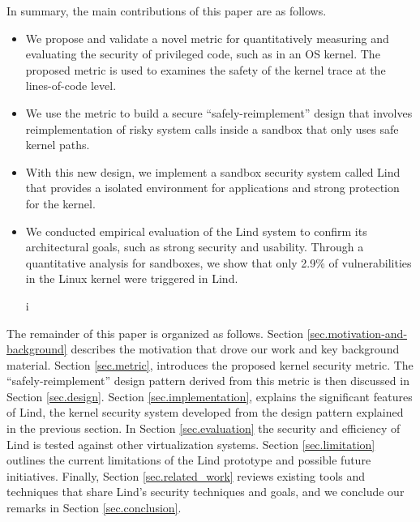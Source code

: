 In summary,
the main contributions of this paper are as follows. %
\begin{itemize}
\item
We propose and validate a novel metric for quantitatively measuring and
evaluating the security of privileged code, such as in an OS kernel.
The proposed metric is used to examines the safety of the kernel trace at the lines-of-code level.


\item
We use the metric to build a secure ``safely-reimplement'' design that
involves reimplementation of risky system calls inside a
sandbox that only uses safe kernel paths.

\item
With this new design, we implement a sandbox security system called Lind
that provides a isolated environment for applications and strong protection for the kernel.

\item
We conducted empirical evaluation of the Lind system to confirm its architectural
 goals, such as strong security and usability.
Through a quantitative analysis for sandboxes, we show that only 2.9\% of
vulnerabilities in the Linux kernel were triggered in Lind.

i%

\end{itemize}

The remainder of this paper is organized as follows.
Section \ref{sec.motivation-and-background} describes the motivation that drove our work and key background material.
Section \ref{sec.metric}, introduces the proposed kernel security metric. The
``safely-reimplement'' design pattern derived from this metric is then discussed in Section \ref{sec.design}. Section \ref{sec.implementation},
explains the significant features of Lind, the kernel security system developed
from the design pattern explained in the previous section. In Section \ref{sec.evaluation} the security and
efficiency of Lind is tested against other virtualization systems.
Section \ref{sec.limitation} outlines the current
limitations of the Lind prototype and possible future initiatives.
Finally, Section \ref{sec.related_work} reviews existing tools and techniques that share
Lind's security techniques and goals, and we conclude our remarks in
Section \ref{sec.conclusion}.